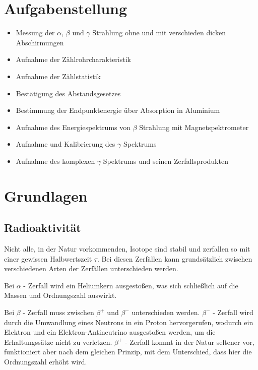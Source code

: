 \documentclass[12pt,english,ngerman]{scrartcl}
\begin{document}
%
\tableofcontents
\newpage

\section{Aufgabenstellung\label{Auf}}

\begin{itemize}
	\item Messung der \(\alpha\), \(\beta\) und \(\gamma\) Strahlung ohne und mit
	      verschieden dicken Abschirmungen
	\item Aufnahme der Zählrohrcharakteristik
	\item Aufnahme der Zählstatistik
	\item Bestätigung des Abstandsgesetzes
	\item Bestimmung der Endpunktenergie über Absorption in Aluminium
	\item Aufnahme des Energiespektrums von \(\beta\) Strahlung mit Magnetspektrometer
	\item Aufnahme und Kalibrierung des \(\gamma\) Spektrums
	\item Aufnahme des komplexen \(\gamma\) Spektrums und seinen Zerfallsprodukten
\end{itemize}

\section{Grundlagen}\label{Grund}

\subsection{Radioaktivität}
Nicht alle, in der Natur vorkommenden, Isotope sind stabil und zerfallen so mit
einer gewissen Halbwertszeit \(\tau\). Bei diesen Zerfällen kann grundsätzlich
zwischen verschiedenen Arten der Zerfällen unterschieden werden.

Bei \(\alpha\) - Zerfall wird ein Heliumkern ausgestoßen, was sich schließlich
auf die Massen und Ordnungszahl auswirkt.

Bei \(\beta\) - Zerfall muss zwischen \(\beta^+\) und \(\beta^-\) unterschieden
werden. \(\beta^-\) - Zerfall wird durch die Umwandlung eines Neutrons in ein
Proton hervorgerufen, wodurch ein Elektron und ein Elektron-Antineutrino
ausgestoßen werden, um die Erhaltungssätze nicht zu verletzen. \(\beta^+\) -
Zerfall kommt in der Natur seltener vor, funktioniert aber nach dem gleichen
Prinzip, mit dem Unterschied, dass hier die Ordnungszahl erhöht wird.
\end{document}
